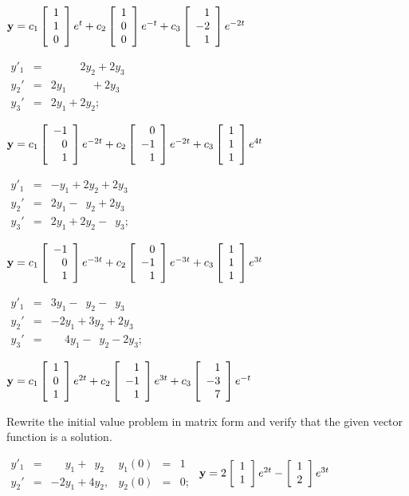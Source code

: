 \begin{exerciselist}
\begin{alist}
    ${\bf y}=c_{1}\left[\begin{array}{r}1\\1\\0\end{array}\right]e^{t}+c_{2}\left[\begin{array}{r}1\\0\\0\end{array}\right]e^{-t}+c_{3}\left[\begin{array}{r}1\\-2\\1\end{array}\right]e^{-2t}$

    \item %
    $\begin{array}{ccc}
      y'_{1} & = & \phantom{2y_{1}+}2y_{2}+2y_{3}   \\
      y_{2}' & = & 2y_{1}\phantom{+2y_{2}}+2y_{3}   \\
      y_{3}' & = & 2y_{1}+ 2y_{2};\phantom{+2y_{3}}
    \end{array}$

    ${\bf y}=c_{1}\left[\begin{array}{r}-1\\0\\1\end{array}\right]e^{-2t}+c_{2}\left[\begin{array}{r}0\\-1\\1\end{array}\right]e^{-2t}+c_{3}\left[\begin{array}{r}1\\1\\1\end{array}\right]e^{4t}$

    \item %
    $\begin{array}{ccr}
      y'_{1} & = & -y_{1}+2y_{2}+2y_{3}             \\
      y_{2}' & = & 2y_{1}-\phantom{2}y_{2}+2y_{3}   \\
      y_{3}' & = & 2y_{1}+2y_{2} -\phantom{2}y_{3};
    \end{array}$

    ${\bf y}=c_{1}\left[\begin{array}{r}-1\\0\\1\end{array}\right]e^{-3t}+c_{2}\left[\begin{array}{r}0\\-1\\1\end{array}\right]e^{-3t}+c_{3}\left[\begin{array}{r}1\\1\\1\end{array}\right]e^{3t}$

    \item %
    $\begin{array}{ccr}
      y'_{1} & = & 3y_{1}-\phantom{2}y_{2} -\phantom{2}y_{3}   \\
      y_{2}' & = & -2y_{1}+3y_{2}+2y_{3}                       \\
      y_{3}' & = & \phantom{-}4y_{1}-\phantom{3}y_{2}- 2y_{3};
    \end{array}$

    ${\bf y}=c_{1}\left[\begin{array}{r}1\\0\\1\end{array}\right]e^{2t}+c_{2}\left[\begin{array}{r}1\\-1\\1\end{array}\right]e^{3t}+c_{3}\left[\begin{array}{r}1\\-3\\7\end{array}\right]e^{-t}$
  \end{alist}

  \item\label{exer:10.2.3} Rewrite the initial value problem in matrix form and verify that the
        given vector function is a solution.

  \begin{alist}
    \item %
    $\begin{array}{ccl}
      y'_{1} & = & \phantom{-2}y_{1}+\phantom{4}y_{2} \\
      y_{2}' & = & -2y_{1}+ 4y_{2},
    \end{array}
    \begin{array}{ccr}
      y_{1}(0) & = & 1  \\
      y_{2}(0) & = & 0;
    \end{array}$ \quad ${\bf y}=2\left[\begin{array}{l}1\\1\end{array}\right]e^{2t}-\left[\begin{array}{l}1\\2\end{array}\right]e^{3t}$


\end{alist}
\end{exerciselist}
